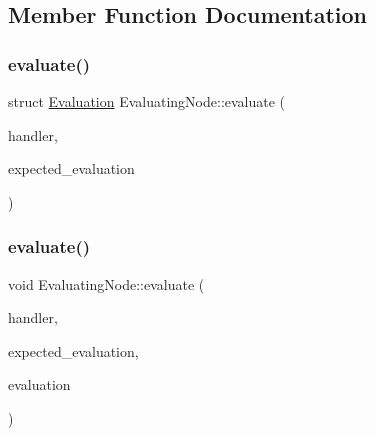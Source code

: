 \subsection{Member Function Documentation}
\mbox{\label{classEvaluatingNode_a49e3ccc15a4fc2d4ecd4d264c86dea5e}} 
\subsubsection{\texorpdfstring{evaluate()}{evaluate()}\hspace{0.1cm}{\footnotesize\ttfamily [1/2]}}
{\footnotesize\ttfamily struct \hyperlink{structEvaluation}{Evaluation} Evaluating\+Node\+::evaluate (\begin{DoxyParamCaption}\item[{\hyperlink{classSystemHandler}{System\+Handler} $\ast$}]{handler,  }\item[{\hyperlink{statics_8h_a6664c451ca7787483a7981cc1de68dbb}{E\+V\+A\+L\+U\+A\+T\+I\+O\+N\+\_\+\+T\+Y\+PE}}]{expected\+\_\+evaluation }\end{DoxyParamCaption})}

\mbox{\label{classEvaluatingNode_ae20449b7c2e423d64664503befd47ba0}} 
\subsubsection{\texorpdfstring{evaluate()}{evaluate()}\hspace{0.1cm}{\footnotesize\ttfamily [2/2]}}
{\footnotesize\ttfamily void Evaluating\+Node\+::evaluate (\begin{DoxyParamCaption}\item[{\hyperlink{classSystemHandler}{System\+Handler} $\ast$}]{handler,  }\item[{\hyperlink{statics_8h_a6664c451ca7787483a7981cc1de68dbb}{E\+V\+A\+L\+U\+A\+T\+I\+O\+N\+\_\+\+T\+Y\+PE}}]{expected\+\_\+evaluation,  }\item[{struct \hyperlink{structEvaluation}{Evaluation} $\ast$}]{evaluation }\end{DoxyParamCaption})}

\mbox{\label{classEvaluatingNode_a085fa06e0b46a93c814dc55cda0c1b26}} 
